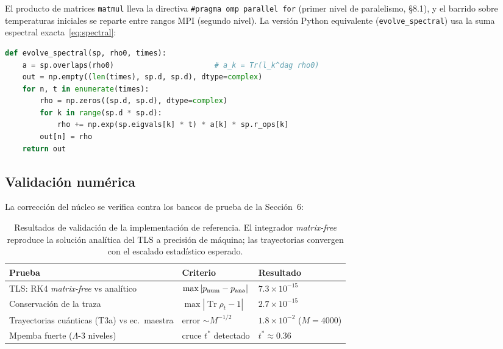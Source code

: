 \documentclass[11pt,a4paper]{article}
\theoremstyle{definition}
\theoremstyle{plain}
\renewcommand{\Tr}{\operatorname{Tr}}
\begin{document}
El producto de matrices \texttt{matmul} lleva la directiva
\texttt{\#pragma omp parallel for} (primer nivel de paralelismo, §8.1), y el
barrido sobre temperaturas iniciales se reparte entre rangos MPI (segundo nivel).
La versión Python equivalente (\texttt{evolve\_spectral}) usa la suma espectral
exacta~\eqref{eq:spectral}:

\begin{lstlisting}[language=Python,caption={Evolución exacta por modos (\texttt{python/qmpe.py}).}]
def evolve_spectral(sp, rho0, times):
    a = sp.overlaps(rho0)                       # a_k = Tr(l_k^dag rho0)
    out = np.empty((len(times), sp.d, sp.d), dtype=complex)
    for n, t in enumerate(times):
        rho = np.zeros((sp.d, sp.d), dtype=complex)
        for k in range(sp.d * sp.d):
            rho += np.exp(sp.eigvals[k] * t) * a[k] * sp.r_ops[k]
        out[n] = rho
    return out
\end{lstlisting}

\subsection{Validación numérica}

La corrección del núcleo se verifica contra los bancos de prueba de la Sección~6:

\begin{table}[h]
\centering
\small
\begin{tabular}{@{}lll@{}}
\toprule
Prueba & Criterio & Resultado \\
\midrule
TLS: RK4 \emph{matrix-free} vs analítico & $\max|p_{\rm num}-p_{\rm ana}|$ & $7.3\times10^{-15}$ \\
Conservación de la traza & $\max|\Tr\rho_t-1|$ & $2.7\times10^{-15}$ \\
Trayectorias cuánticas (T3a) vs ec.\ maestra & error $\sim M^{-1/2}$ & $1.8\times10^{-2}$ ($M{=}4000$) \\
Mpemba fuerte ($\Lambda$-3 niveles) & cruce $t^*$ detectado & $t^*\approx0.36$ \\
\bottomrule
\end{tabular}
\caption{Resultados de validación de la implementación de referencia. El
integrador \emph{matrix-free} reproduce la solución analítica del TLS a
precisión de máquina; las trayectorias convergen con el escalado estadístico
esperado.}
\end{table}
\end{document}
